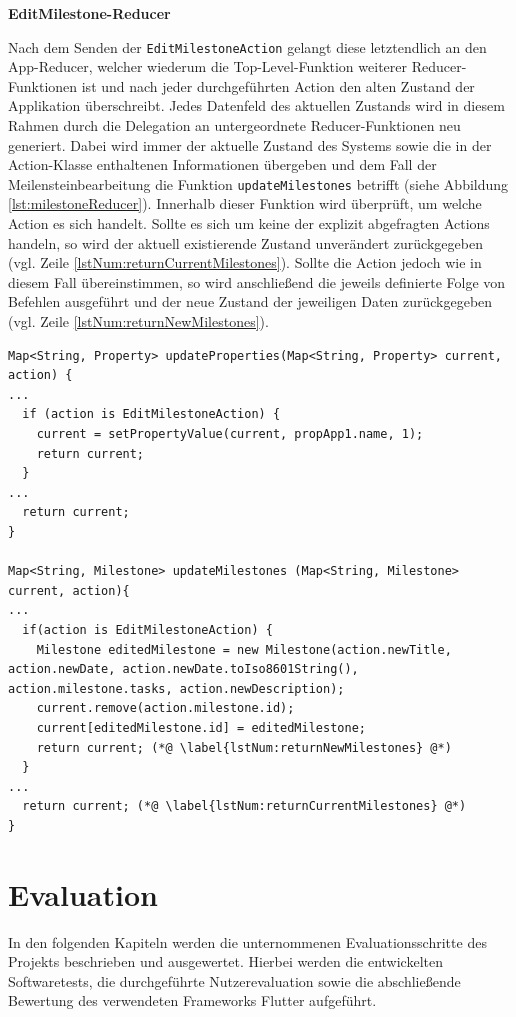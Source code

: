 \documentclass[bibliography=totoc,listof=totoc,BCOR=5mm,DIV=12,oneside]{scrbook}
\begin{document}
{\par \textbf{EditMilestone-Reducer}
\par Nach dem Senden der \texttt{EditMilestoneAction} gelangt diese letztendlich an den App-Reducer, welcher wiederum die Top-Level-Funktion weiterer Reducer-Funktionen ist und nach jeder durchgeführten Action den alten Zustand der Applikation überschreibt. Jedes Datenfeld des aktuellen Zustands wird in diesem Rahmen durch die Delegation an untergeordnete Reducer-Funktionen neu generiert. Dabei wird immer der aktuelle Zustand des Systems sowie die in der Action-Klasse enthaltenen Informationen übergeben und dem Fall der Meilensteinbearbeitung die Funktion \texttt{updateMilestones} betrifft (siehe Abbildung \ref{lst:milestoneReducer}). Innerhalb dieser Funktion wird überprüft, um welche Action es sich handelt. Sollte es sich um keine der explizit abgefragten Actions handeln, so wird der aktuell existierende Zustand unverändert zurückgegeben (vgl. Zeile \ref{lstNum:returnCurrentMilestones}). Sollte die Action jedoch wie in diesem Fall übereinstimmen, so wird anschließend die jeweils definierte Folge von Befehlen ausgeführt und der neue Zustand der jeweiligen Daten zurückgegeben (vgl. Zeile \ref{lstNum:returnNewMilestones}).

\newpage
\bigskip
\begin{lstlisting}[caption={Reducer Beispiel},captionpos=b, label=lst:milestoneReducer]
Map<String, Property> updateProperties(Map<String, Property> current, action) {
...
  if (action is EditMilestoneAction) {
    current = setPropertyValue(current, propApp1.name, 1);
    return current;
  }
...
  return current;
}

Map<String, Milestone> updateMilestones (Map<String, Milestone> current, action){
...
  if(action is EditMilestoneAction) {
    Milestone editedMilestone = new Milestone(action.newTitle, action.newDate, action.newDate.toIso8601String(), action.milestone.tasks, action.newDescription);
    current.remove(action.milestone.id);
    current[editedMilestone.id] = editedMilestone;
    return current; (*@ \label{lstNum:returnNewMilestones} @*)
  } 
...
  return current; (*@ \label{lstNum:returnCurrentMilestones} @*)
}
\end{lstlisting}
\bigskip

\chapter{Evaluation} \label{chap:nachweisführung}
\par In den folgenden Kapiteln werden die unternommenen Evaluationsschritte des Projekts beschrieben und ausgewertet. Hierbei werden die entwickelten Softwaretests, die durchgeführte Nutzerevaluation sowie die abschließende Bewertung des verwendeten Frameworks Flutter aufgeführt.

}
\end{document}
